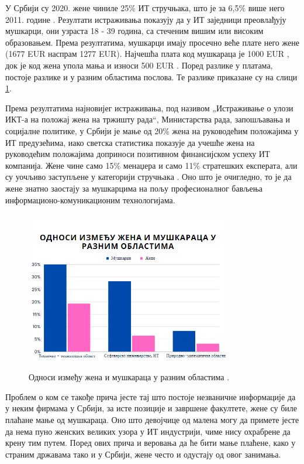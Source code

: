 \documentclass[a4paper]{article}
\begin{document}
У Србији су 2020. жене чиниле 25\% ИТ стручњака, што је за 6,5\% више него 2011. године 
\cite{danas_it}. Резултати истраживања показују да у ИТ заједници преовлађују мушкарци, они 
узраста 18 - 39 година, са стеченим вишим или високим образовањем. Према резултатима, мушкарци 
имају просечно веће плате него жене (1677 EUR наспрам 1277 EUR). Најчешћа плата код мушкараца је 
1000 EUR , док је код жена упола мања и износи 500 EUR \cite{puls_srpske_it}. Поред разлике у 
платама, постоје разлике и у разним областима послова. Те разлике приказане су на слици 
\ref{fig:odnosi}.

Према резултатима најновијег истраживања, под називом „Истраживање о улози ИКТ-а на положај жена 
на тржишту рада“, Министарства рада, запошљавања и социјалне политике, у Србији је мање од 20\% 
жена на руководећим положајима у ИТ предузећима, иако светска статистика показује да учешће жена 
на руководећим положајима доприноси позитивном финансијском успеху ИТ компанија.
Жене чине само 15\% менаџера и само 11\% стратешких експерата, али су уочљиво заступљене у 
категорији стручњака \cite{dijalog_it}. Оно што је очигледно, то је да жене знатно заостају за 
мушкарцима на пољу професионалног бављења информационо-комуникационим технологијама.\\

\begin{figure}[h!]
    \centering
    \includegraphics[width=0.8\textwidth, height=7cm]{Slike/odnos_oblasti.png}
    \caption{Односи између жена и мушкараца у разним областима \cite{zene_i_musk_u_Srb}.}
    \label{fig:odnosi}
\end{figure}

Проблем о ком се такође прича јесте тај што постоје незваничне информације да у неким фирмама у 
Србији, за исте позиције и завршене факултете, жене су биле плаћане мање од мушкараца. Оно што 
девојчице од малена могу да примете јесте да нема пуно женских великих узора у ИТ индустрији, чиме
нису охрабрене да крену тим путем. Поред ових прича и веровања да ће бити мање плаћене, како у 
страним државама тако и у Србији, жене често и одустају од овог занимања. 
\end{document}
